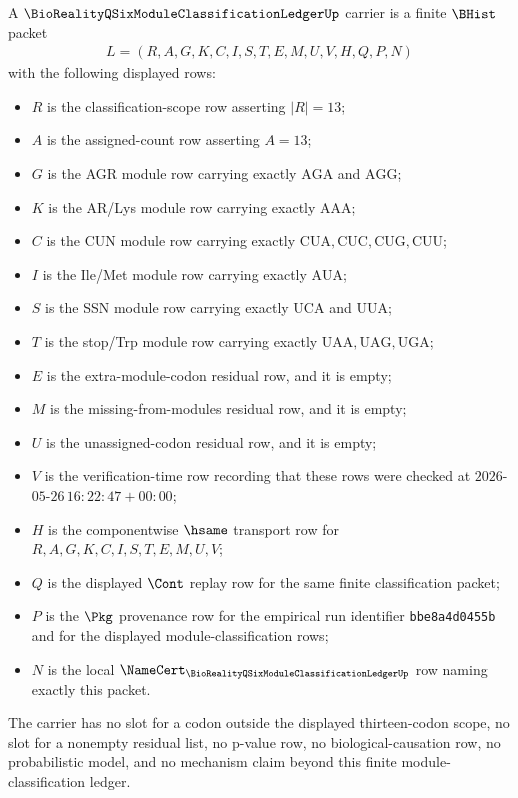 \begin{definition}
\label{def:bioreality-q-six-module-classification-ledger-carrier}
A $\BioRealityQSixModuleClassificationLedgerUp$ carrier is a finite $\BHist$ packet
$$
\begin{gathered}
L=(R,A,G,K,C,I,S,T,E,M,U,V,H,Q,P,N)
\end{gathered}
$$
with the following displayed rows:
\begin{itemize}
\item $R$ is the classification-scope row asserting $|R|=13$;
\item $A$ is the assigned-count row asserting $A=13$;
\item $G$ is the AGR module row carrying exactly $\mathrm{AGA}$ and $\mathrm{AGG}$;
\item $K$ is the AR/Lys module row carrying exactly $\mathrm{AAA}$;
\item $C$ is the CUN module row carrying exactly $\mathrm{CUA},\mathrm{CUC},\mathrm{CUG},\mathrm{CUU}$;
\item $I$ is the Ile/Met module row carrying exactly $\mathrm{AUA}$;
\item $S$ is the SSN module row carrying exactly $\mathrm{UCA}$ and $\mathrm{UUA}$;
\item $T$ is the stop/Trp module row carrying exactly $\mathrm{UAA},\mathrm{UAG},\mathrm{UGA}$;
\item $E$ is the extra-module-codon residual row, and it is empty;
\item $M$ is the missing-from-modules residual row, and it is empty;
\item $U$ is the unassigned-codon residual row, and it is empty;
\item $V$ is the verification-time row recording that these rows were checked at $2026$-$05$-$26\,16\!:\!22\!:\!47+00\!:\!00$;
\item $H$ is the componentwise $\hsame$ transport row for $R,A,G,K,C,I,S,T,E,M,U,V$;
\item $Q$ is the displayed $\Cont$ replay row for the same finite classification packet;
\item $P$ is the $\Pkg$ provenance row for the empirical run identifier \texttt{bbe8a4d0455b} and for the displayed module-classification rows;
\item $N$ is the local $\NameCert_{\BioRealityQSixModuleClassificationLedgerUp}$ row naming exactly this packet.
\end{itemize}
The carrier has no slot for a codon outside the displayed thirteen-codon scope, no slot for a nonempty residual list, no p-value row, no biological-causation row, no probabilistic model, and no mechanism claim beyond this finite module-classification ledger.
\end{definition}

